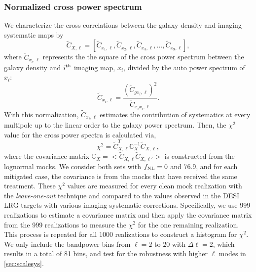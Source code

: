 \subsubsection{Normalized cross power spectrum}

We characterize the cross correlations between the galaxy density and imaging systematic maps by
\begin{equation}
\tilde{C}_{X, \ell} = [\tilde{C}_{x_{1}, \ell}, \tilde{C}_{x_{2}, \ell}, \tilde{C}_{x_{3}, \ell}, ..., \tilde{C}_{x_{9}, \ell}],
\end{equation}
where $\tilde{C}_{x_{i}, \ell}$ represents the the square of the cross power spectrum between the galaxy density and $i^{\rm th}$ imaging map, $x_{i}$, divided by the auto power spectrum of $x_{i}$:
\begin{equation}\label{eq:cx}
\tilde{C}_{x_{i}, \ell} = \frac{(\tilde{C}_{gx_{i}, \ell})^{2}}{\tilde{C}_{x_{i}x_{i},\ell}}.
\end{equation}
With this normalization, $\tilde{C}_{x_{i}, \ell}$ estimates the contribution of systematics at every multipole up to the linear order to the galaxy power spectrum. Then, the $\chi^{2}$ value for the cross power spectra is calculated via,
\begin{equation}\label{eq:cx_chi2}
\chi^{2} = \tilde{C}^{T}_{X, \ell} \mathbb{C}_{X}^{-1} \tilde{C}_{X, \ell},
\end{equation}
where the covariance matrix $\mathbb{C}_{X} = < \tilde{C}_{X, \ell} \tilde{C}_{X, \ell'} >$ is constructed from the lognormal mocks. We consider both sets with $f_{\rm NL}=0$ and $76.9$, and for each mitigated case, the covariance is from the mocks that have received the same treatment. These $\chi^{2}$ values are measured for every clean mock realization with the \textit{leave-one-out} technique and compared to the values observed in the DESI LRG targets with various imaging systematic corrections. Specifically, we use 999 realizations to estimate a covariance matrix and then apply the covariance matrix from the 999 realizations to measure the $\chi^{2}$ for the one remaining realization. This process is repeated for all 1000 realizations to construct a histogram for $\chi^{2}$. We only include the bandpower bins from $\ell=2$ to $20$ with $\Delta\ell=2$, which results in a total of 81 bins, and test for the robustness with higher $\ell$ modes in \ref{sec:scalesys}. 

